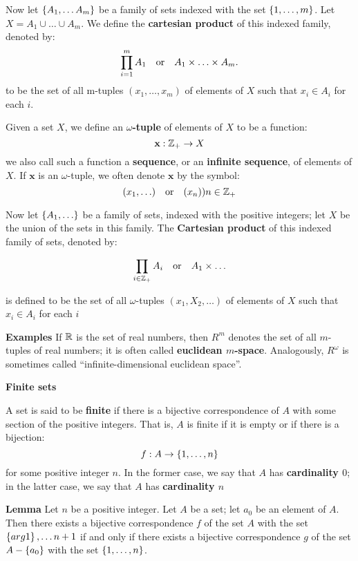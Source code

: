 Now let $ \left\lbrace A_1, \ldots A_m \right\rbrace $ be a family of sets indexed with the set $ \left\lbrace 1, \ldots, m \right\rbrace $. Let $ X = A_1 \cup \ldots \cup A_m $. We define the \textbf{cartesian product} of this indexed family, denoted by:
\[ \prod_{i=1}^{m} A_1 \quad \textrm{or} \quad A_1 \times \ldots \times A_m.  \]
to be the set of all m-tuples $(x_1, \ldots, x_m) $ of elements of $X$ such that $ x_i \in A_i $ for each $i$.

\begin{defn}
	Given a set $X$, we define an\textbf{ $ \omega$-tuple} of elements of $X$ to be a function:
	\[ \textbf{x}: \mathbb{Z}_+ \rightarrow X \]
	we also call such a function a \textbf{sequence}, or an \textbf{infinite sequence}, of elements of $X$. If $\textbf{x}$ is an $\omega$-tuple, we often denote $\textbf{x} $ by the symbol:
	\[ (x_1, \ldots) \quad \textrm{or} \quad (x_n)){n\in \mathbb{Z}_+} \]
\end{defn}	
Now let $ \left\lbrace A_1, \ldots \right\rbrace $ be a family of sets, indexed with the positive integers; let $X$ be the union of the sets in this family. The \textbf{Cartesian product} of this indexed family of sets, denoted by:

 \[ \prod_{i \in \mathbb{Z}_+} A_i \quad \textrm{or} \quad A_1 \times \ldots \] 
 
 is defined to be the set of all $ \omega $-tuples $ (x_1,X_2, \ldots)  $ of elements of $X$ such that $ x_i \in A_i $ for each $i$

\textbf{Examples}
If $ \mathbb{R} $ is the set of real numbers, then $ R^m $ denotes the set of all $ m $-tuples of real numbers; it is often called \textbf{euclidean $ m $-space}. Analogously, $ R^\omega $ is sometimes called ``infinite-dimensional euclidean space''.

\textbf{\LARGE Finite sets}

\begin{defn}
	A set is said to be \textbf{finite} if there is a bijective correspondence of $A$ with some section of the positive integers. That is, $A$ is finite if it is empty or if there is a bijection:
	\[ f : A \rightarrow \left\lbrace 1,\ldots,n \right\rbrace \]
	for some positive integer $n$. In the former case, we say that $A$ has \textbf{cardinality $0$}; in the latter case, we say that $A$ has \textbf{cardinality $n$}
\end{defn}

\textbf{Lemma} Let $n$ be a positive integer. Let $A$ be a set; let $a_0$ be an element of $A$. Then there exists a bijective correspondence $f$ of the set $A$ with the set $\left\lbrace arg1 \right\rbrace, \ldots n+1$ if and only if there exists a bijective correspondence $g$ of the set $ A - \left\lbrace a_0 \right\rbrace$ with the set $ \left\lbrace 1, \ldots, n \right\rbrace $.

